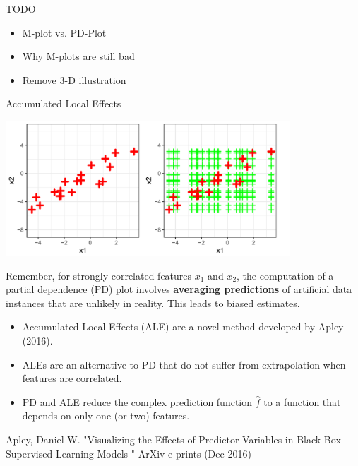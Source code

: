 








\begin{vbframe}{TODO}

\begin{itemize}
\item M-plot vs. PD-Plot
\item Why M-plots are still bad
\item Remove 3-D illustration
\end{itemize}

\end{vbframe}

\begin{vbframe}{Accumulated Local Effects}


\begin{center}
\includegraphics[width=0.8\textwidth]{figure_man/accu01.png}
\end{center}

Remember, for strongly correlated features $x_1$ and $x_2$, the computation of a partial dependence (PD) plot involves \textbf{averaging predictions} of artificial data instances that are unlikely in reality.
This leads to biased estimates.

\framebreak

\begin{itemize}
  \item Accumulated Local Effects (ALE) are a novel method developed by Apley (2016).
  \item ALEs are an alternative to PD that do not suffer from extrapolation when features are correlated.
  \item PD and ALE reduce the complex prediction function $\hat{f}$ to a function that depends on only one (or two) features.
\end{itemize}
\vspace{1cm}
{\tiny{Apley, Daniel W. "Visualizing the Effects of Predictor Variables in Black Box Supervised Learning Models " ArXiv e-prints (Dec 2016)}\par}
\end{vbframe}

